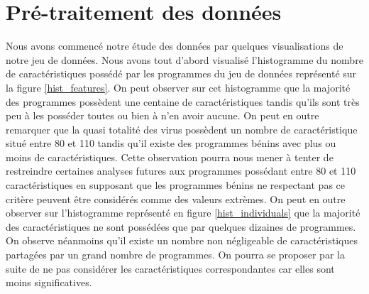 \documentclass[11pt,a4paper]{article}
\begin{document}
\section{Pré-traitement des données}
	Nous avons commencé notre étude des données par quelques visualisations de notre jeu de données. Nous avons tout d'abord visualisé l'histogramme du nombre de caractéristiques possédé par les programmes du jeu de données représenté sur la figure \ref{hist_features}. On peut observer sur cet histogramme que la majorité des programmes possèdent une centaine de caractéristiques tandis qu'ils sont très peu à les posséder toutes ou bien à n'en avoir aucune. On peut en outre remarquer que la quasi totalité des virus possèdent un nombre de caractéristique situé entre 80 et 110 tandis qu'il existe des programmes bénins avec plus ou moins de caractéristiques. Cette observation pourra nous mener à tenter de restreindre certaines analyses futures aux programmes possédant entre 80 et 110 caractéristiques en supposant que les programmes bénins ne respectant pas ce critère peuvent être considérés comme des valeurs extrèmes.
	On peut en outre observer sur l'histogramme représenté en figure \ref{hist_individuals} que la majorité des caractéristiques ne sont possédées que par quelques dizaines de programmes. On observe néanmoins qu'il existe un nombre non négligeable de caractéristiques partagées par un grand nombre de programmes. On pourra se proposer par la suite de ne pas considérer les caractéristiques correspondantes car elles sont moins significatives.
\end{document}
